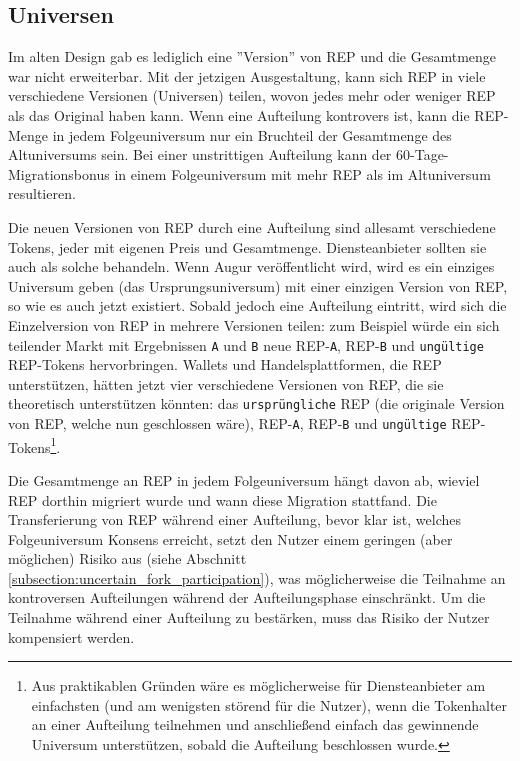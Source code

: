 \documentclass[floatfix,reprint,nofootinbib,amsmath,amssymb,epsfig,pre,floats,letterpaper,groupedaffiliation]{revtex4-1}
\theoremstyle{definition}
\theoremstyle{definition}
\theoremstyle{definition}
\begin{document}
\begin{appendix}
\subsection{Universen}

Im alten Design gab es lediglich eine ''Version'' von REP und die Gesamtmenge war nicht erweiterbar. Mit der jetzigen Ausgestaltung, kann sich REP in viele verschiedene Versionen (Universen) teilen, wovon jedes mehr oder weniger REP als das Original haben kann. Wenn eine Aufteilung kontrovers ist, kann die REP-Menge in jedem Folgeuniversum nur ein Bruchteil der Gesamtmenge des Altuniversums sein. Bei einer unstrittigen Aufteilung kann der 60-Tage-Migrationsbonus in einem Folgeuniversum mit mehr REP als im Altuniversum resultieren.

Die neuen Versionen von REP durch eine Aufteilung sind allesamt verschiedene Tokens, jeder mit eigenen Preis und Gesamtmenge. Diensteanbieter sollten sie auch als solche behandeln. Wenn Augur veröffentlicht wird, wird es ein einziges Universum geben (das Ursprungsuniversum) mit einer einzigen Version von REP, so wie es auch jetzt existiert. Sobald jedoch eine Aufteilung eintritt, wird sich die Einzelversion von REP in mehrere Versionen teilen: zum Beispiel würde ein sich teilender Markt mit Ergebnissen \texttt{A} und \texttt{B} neue REP-\texttt{A}, REP-\texttt{B} und \texttt{ungültige} REP-Tokens hervorbringen. Wallets und Handelsplattformen, die REP unterstützen, hätten jetzt vier verschiedene Versionen von REP, die sie theoretisch unterstützen könnten: das \texttt{ursprüngliche} REP (die originale Version von REP, welche nun geschlossen wäre), REP-\texttt{A}, REP-\texttt{B} und \texttt{ungültige} REP-Tokens\footnote{Aus praktikablen Gründen wäre es möglicherweise für Diensteanbieter am einfachsten (und am wenigsten störend für die Nutzer), wenn die Tokenhalter an einer Aufteilung teilnehmen und anschließend einfach das gewinnende Universum unterstützen, sobald die Aufteilung beschlossen wurde.}.

Die Gesamtmenge an REP in jedem Folgeuniversum hängt davon ab, wieviel REP dorthin migriert wurde und wann diese Migration stattfand. Die Transferierung von REP während einer Aufteilung, bevor klar ist, welches Folgeuniversum Konsens erreicht, setzt den Nutzer einem geringen (aber möglichen) Risiko aus (siehe Abschnitt \ref{subsection:uncertain_fork_participation}), was möglicherweise die Teilnahme an kontroversen Aufteilungen während der Aufteilungsphase einschränkt. Um die Teilnahme während einer Aufteilung zu bestärken, muss das Risiko der Nutzer kompensiert werden.


\end{appendix}
\end{document}
